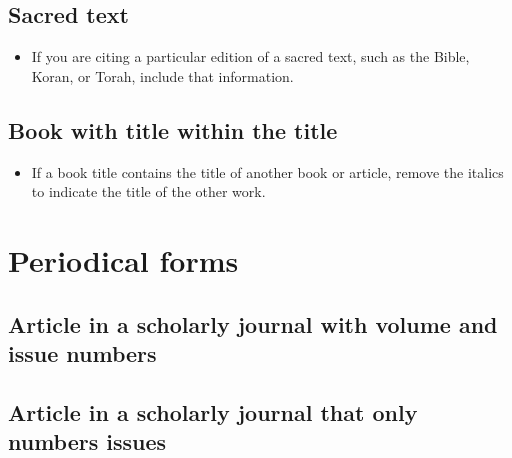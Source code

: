 {\subsection{Sacred text}

 \bigskip

\begin{itemize}\item If you are citing a particular edition of a sacred text, such as the Bible, Koran, or Torah, include that information.\end{itemize}


\subsection{Book with title within the title}



\begin{itemize}\item If a book title contains the title of another book or article, remove the italics to indicate the title
of the other work.\end{itemize}


\section{Periodical forms}

\subsection{Article in a scholarly journal with volume and issue numbers}

\subsection{Article in a scholarly journal that only numbers issues}


}
